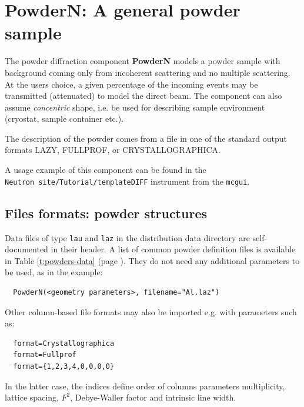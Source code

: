 \section{PowderN: A general powder sample}
\label{powder}


The powder diffraction component {\bf PowderN} models a powder sample
with background coming only from incoherent scattering and no
multiple scattering. At the users choice, a given percentage of the incoming
events may be transmitted (attenuated) to model the direct beam. The component can also
assume \emph{concentric} shape, i.e. be used for describing sample environment (cryostat,
sample container etc.). 

The description of the powder comes from a file in one of the standard output formats LAZY, FULLPROF, or CRYSTALLOGRAPHICA.

A usage example of this component can be found in the \\
\verb+Neutron site/Tutorial/templateDIFF+ instrument from the \verb+mcgui+.

\subsection{Files formats: powder structures}

Data files of type \verb'lau' and \verb'laz' in the \MCS distribution data directory are self-documented in their header. A list of common powder definition files is available in Table \ref{t:powders-data} (page \pageref{t:powders-data}). They do not need any additional parameters to be used, as in the example:
\begin{lstlisting}
  PowderN(<geometry parameters>, filename="Al.laz")
\end{lstlisting}
Other column-based file formats may also be imported e.g. with parameters such as:
\begin{lstlisting}
  format=Crystallographica
  format=Fullprof
  format={1,2,3,4,0,0,0,0}
\end{lstlisting}
In the latter case, the indices define order of columns parameters
multiplicity, lattice spacing, $F^2$, Debye-Waller factor and intrinsic line width.

